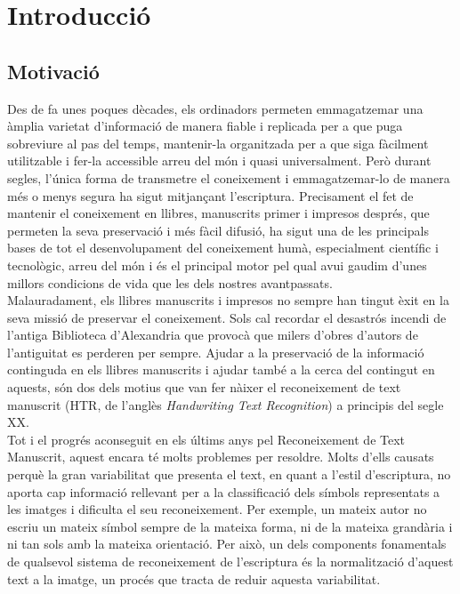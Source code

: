 \chapter{Introducció}
\label{cap:int}

\section{Motivació}
Des de fa unes poques dècades, els ordinadors permeten emmagatzemar una àmplia varietat d'informació de manera fiable i replicada per a que puga sobreviure al pas del temps, mantenir-la organitzada per a que siga fàcilment utilitzable i fer-la accessible arreu del món i quasi universalment. Però durant segles, l'única forma de transmetre el coneixement i emmagatzemar-lo de manera més o menys segura ha sigut mitjançant l'escriptura. Precisament el fet de mantenir el coneixement en llibres, manuscrits primer i impresos després, que permeten la seva preservació i més fàcil difusió, ha sigut una de les principals bases de tot el desenvolupament del coneixement humà, especialment científic i tecnològic, arreu del món i és el principal motor pel qual avui gaudim d'unes millors condicions de vida que les dels nostres avantpassats.\\

Malauradament, els llibres manuscrits i impresos no sempre han tingut èxit en la seva missió de preservar el coneixement. Sols cal recordar el desastrós incendi de l'antiga Biblioteca d'Alexandria que provocà que milers d'obres d'autors de l'antiguitat es perderen per sempre. Ajudar a la preservació de la informació continguda en els llibres manuscrits i ajudar també a la cerca del contingut en aquests, són dos dels motius que van fer nàixer el reconeixement de text manuscrit (HTR, de l'anglès \emph{Handwriting Text Recognition}) a principis del segle XX.\\

Tot i el progrés aconseguit en els últims anys pel Reconeixement de Text Manuscrit, aquest encara té molts problemes per resoldre. Molts d'ells causats perquè la gran variabilitat que presenta el text, en quant a l'estil d'escriptura, no aporta cap informació rellevant per a la classificació dels símbols representats a les imatges i dificulta el seu reconeixement. Per exemple, un mateix autor no escriu un mateix símbol sempre de la mateixa forma, ni de la mateixa grandària i ni tan sols amb la mateixa orientació. Per això, un dels components fonamentals de qualsevol sistema de reconeixement de l'escriptura és la normalització d'aquest text a la imatge, un procés que tracta de reduir aquesta variabilitat.\\


